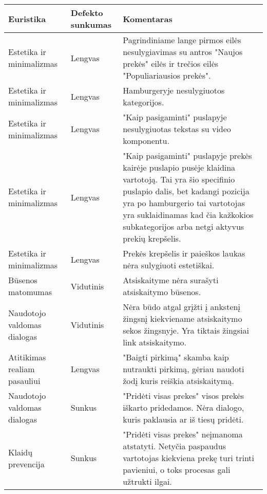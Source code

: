 \documentclass[oneside]{VUMIFPSkursinis}
\begin{document}
\begin{center}
	\begin{tabular}{ |p{3cm}| p{3cm} | p{11cm} | }
		\hline
		Euristika                    & Defekto sunkumas & Komentaras \\ \hline
		Estetika ir minimalizmas     & Lengvas          &
			Pagrindiniame lange pirmos eilės nesulygiavimas su antros "Naujos prekės" eilės ir trečios eilės "Populiariausios prekės".
			\\ \hline
		Estetika ir minimalizmas     & Lengvas          &
			Hamburgeryje nesulygiuotos kategorijos.
			\\ \hline
		Estetika ir minimalizmas     & Lengvas          &
			"Kaip pasigaminti" puslapyje nesulygiuotas tekstas su video komponentu.
			\\ \hline
		Estetika ir minimalizmas     & Lengvas          &
			"Kaip pasigaminti" puslapyje prekės kairėje puslapio pusėje klaidina vartotoją.
			Tai yra šio specifinio puslapio dalis, bet kadangi pozicija yra po hamburgerio tai vartotojas yra suklaidinamas kad čia kažkokios subkategorijos arba netgi aktyvus prekių krepšelis.
			\\ \hline
		Estetika ir minimalizmas     & Lengvas          &
			Prekės krepšelis ir paieškos laukas nėra sulygiuoti estetiškai.
			\\ \hline
		Būsenos matomumas            & Vidutinis        &
			Atsiskaityme nėra surašyti atsiskaitymo būsenos.
			\\ \hline
		Naudotojo valdomas dialogas  & Vidutinis         &
			Nėra būdo atgal grįžti į ankstenį žingsnį kiekviename atsiskaitymo sekos žingsnyje.
			Yra tiktais žingsiai link atsiskaitymo.
			\\ \hline
		Atitikimas realiam pasauliui & Lengvas          &
			"Baigti pirkimą" skamba kaip nutraukti pirkimą, gėriau naudoti žodį kuris reiškia atsiskaitymą.
			\\ \hline
		Naudotojo valdomas dialogas  & Sunkus           &
			"Pridėti visas prekes" visos prekės iškarto pridedamos.
			Nėra dialogo, kuris paklausia ar iš tiesų pridėti.
			\\ \hline
		Klaidų prevencija            & Sunkus           &
			"Pridėti visas prekes" neįmanoma atstatyti.
			Netyčia paspaudus vartotojas kiekviena prekę turi trinti pavieniui, o toks procesas gali užtrukti ilgai.
			\\ \hline
	\end{tabular}
\end{center}
\end{document}
